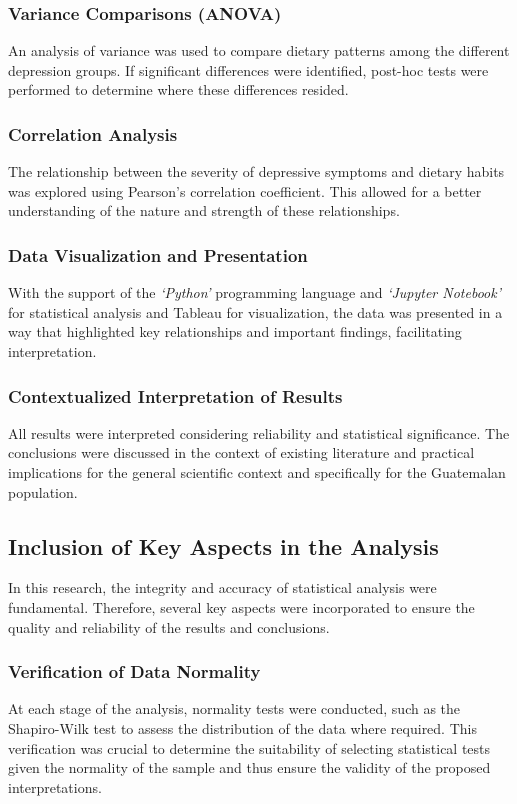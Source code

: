 \documentclass[jou]{apa7}
\begin{document}
\subsubsection{Variance Comparisons (ANOVA)}
An analysis of variance was used to compare dietary patterns among the different depression groups. If significant differences were identified, post-hoc tests were performed to determine where these differences resided.

\subsubsection{Correlation Analysis}
The relationship between the severity of depressive symptoms and dietary habits was explored using Pearson's correlation coefficient. This allowed for a better understanding of the nature and strength of these relationships.

\subsubsection{Data Visualization and Presentation}
With the support of the \emph{`Python'} programming language and \emph{`Jupyter Notebook'} for statistical analysis and Tableau for visualization, the data was presented in a way that highlighted key relationships and important findings, facilitating interpretation.

\subsubsection{Contextualized Interpretation of Results}
All results were interpreted considering reliability and statistical significance. The conclusions were discussed in the context of existing literature and practical implications for the general scientific context and specifically for the Guatemalan population.

\subsection{Inclusion of Key Aspects in the Analysis}\label{inclusiuxf3n-de-aspectos-clave-en-el-anuxe1lisis}

In this research, the integrity and accuracy of statistical analysis were fundamental. Therefore, several key aspects were incorporated to ensure the quality and reliability of the results and conclusions.

\subsubsection{Verification of Data Normality}
At each stage of the analysis, normality tests were conducted, such as the Shapiro-Wilk test to assess the distribution of the data where required. This verification was crucial to determine the suitability of selecting statistical tests given the normality of the sample and thus ensure the validity of the proposed interpretations.
\end{document}
